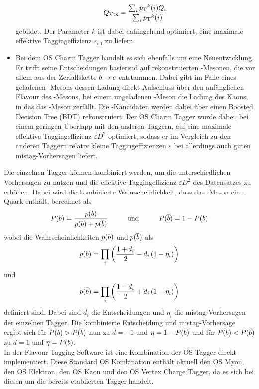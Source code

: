 \begin{itemize}
\begin{equation}
Q_\text{Vtx}=\frac{\sum_{i}\mbox{$p_{\rm T}$}^k(i)Q_i}{\sum_{i}\mbox{$p_{\rm T}$}^k(i)}
\end{equation}
gebildet. Der Parameter $k$ ist dabei dahingehend optimiert, eine maximale effektive Taggingeffizienz $\varepsilon_\text{eff}$ zu liefern.
\item Bei dem OS Charm Tagger handelt es sich ebenfalls um eine Neuentwicklung. Er trifft seine Entscheidungen basierend auf rekonstruierten \D-Mesonen, die vor allem aus der Zerfallskette ${b}\rightarrow{\ensuremath{c}}$ entstammen. Dabei gibt im Falle eines geladenen \D-Mesons dessen Ladung direkt Aufschluss über den anfänglichen Flavour des \B-Mesons, bei einem ungeladenen \D-Meson die Ladung des Kaons, in das das \D-Meson zerfällt. Die \D-Kandidaten werden dabei über einen Boosted Decision Tree (BDT) rekonstruiert. Der OS Charm Tagger wurde dabei, bei einem geringen Überlapp mit den anderen Taggern, auf eine maximale effektive Taggingeffizienz $\varepsilon D^2$ optimiert, sodass er im Vergleich zu den anderen Taggern relativ kleine Taggingeffizienzen $\varepsilon$ bei allerdings auch guten mistag-Vorhersagen liefert.
\end{itemize}
Die einzelnen Tagger können kombiniert werden, um die unterschiedlichen Vorhersagen zu nutzen und die effektive Taggingeffizienz $\varepsilon D^2$ des Datensatzes zu erhöhen. Dabei wird die kombinierte Wahrscheinlichkeit, dass das \B-Meson ein \bquark-Quark enthält, berechnet als
\begin{equation}
P({b})=\frac{p({b})}{p({b})+p({\overline {{b}}})} \hspace{1cm}\text{und}\hspace{1cm}P({\overline {{b}}})=1-P({b})
\end{equation}
wobei die Wahrscheinlichkeiten $p({b})$ und $p({\overline {{b}}})$ als
\begin{equation}
p({b})=\prod_{i}\left(\frac{1+d_i}{2}-d_i\left(1-\eta_i\right)\right)
\end{equation}
und
\begin{equation}
p({\overline {{b}}})=\prod_{i}\left(\frac{1-d_i}{2}+d_i\left(1-\eta_i\right)\right)
\end{equation}
definiert sind. Dabei sind $d_i$ die Entscheidungen und $\eta_i$ die mistag-Vorhersagen der einzelnen Tagger. Die kombinierte Entscheidung und mistag-Vorhersage ergibt sich für $P({b})>P({\overline {{b}}})$ nun zu $d=-1$ und $\eta=1-P({b})$ und für $P({b})<P({\overline {{b}}})$ zu $d=1$ und $\eta=P({b})$.\\
In der Flavour Tagging Software ist eine Kombination der OS Tagger direkt implementiert. Diese Standard OS Kombination enthält aktuell den OS Myon, den OS Elektron, den OS Kaon und den OS Vertex Charge Tagger, da es sich bei diesen um die bereits etablierten Tagger handelt.

